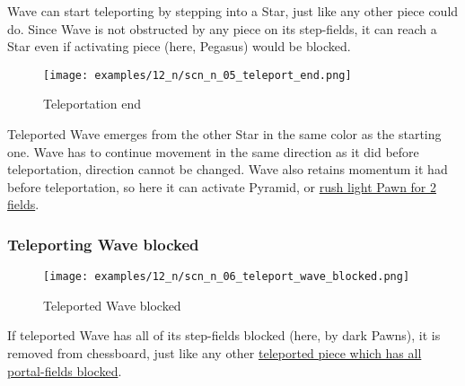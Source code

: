 Wave can start teleporting by stepping into a Star, just like any other piece could
do. Since Wave is not obstructed by any piece on its step-fields, it can reach a Star
even if activating piece (here, Pegasus) would be blocked.

\clearpage %

\vspace*{-2.0\baselineskip}
\noindent
\begin{figure}[!h]
\texttt{[image: examples/12\_n/scn\_n\_05\_teleport\_end.png]}
\caption{Teleportation end}
\label{fig:scn_n_05_teleport_end}
\end{figure}

Teleported Wave emerges from the other Star in the same color as the starting one.
Wave has to continue movement in the same direction as it did before teleportation,
direction cannot be changed. Wave also retains momentum it had before teleportation,
so here it can activate Pyramid, or
\hyperref[fig:scn_mv_36_activating_rush_pawn_init]{rush light Pawn for 2 fields}.

\clearpage %

\subsubsection*{Teleporting Wave blocked}
\label{sec:Nineteen/Star/Teleporting pieces/Teleporting Wave blocked}

\vspace*{-1.0\baselineskip}
\noindent
\begin{figure}[!h]
\texttt{[image: examples/12\_n/scn\_n\_06\_teleport\_wave\_blocked.png]}
\caption{Teleported Wave blocked}
\label{fig:scn_n_06_teleport_wave_blocked}
\end{figure}

If teleported Wave has all of its step-fields blocked (here, by dark Pawns), it is
removed from chessboard, just like any other
\hyperref[fig:scn_n_03_teleport_move_2]{teleported piece which has all portal-fields blocked}.

\clearpage %

